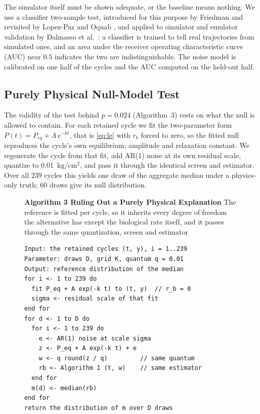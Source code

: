 \documentclass[runningheads]{llncs}
\newcommand{\pu}{\ensuremath{\mathrm{kg/cm^{2}}}}
\newcommand{\rb}{\ensuremath{r_{b}}}
\begin{document}
The simulator itself must be shown adequate, or the baseline means
nothing. We use a classifier two-sample test, introduced for this
purpose by Friedman \cite{friedman2003multivariate} and revisited by
Lopez-Paz and Oquab \cite{lopezpaz2017revisiting}, and applied to
simulator and emulator validation by Dalmasso et
al.~\cite{dalmasso2020validation}: a classifier is trained to tell real
trajectories from simulated ones, and an area under the receiver
operating characteristic curve (AUC) near $0.5$ indicates the
two are indistinguishable. The noise model is calibrated on one half of
the cycles and the AUC computed on the held-out half.

\subsection{Purely Physical Null-Model Test}
\label{sec:null}

The validity of the test behind $p=0.024$ (Algorithm~3) rests on what the null is
allowed to contain. For each retained cycle we fit the two-parameter
form $P(t)=P_{eq}+A\,e^{-kt}$, that is \eqref{eq:le} with $\rb$ forced
to zero, so the fitted null reproduces the cycle's own equilibrium,
amplitude and relaxation constant. We regenerate the cycle from that
fit, add AR(1) noise at its own residual scale, quantize to
$0.01$~\pu{}, and pass it through the identical screen and estimator.
Over all $239$ cycles this yields one draw of the aggregate median
under a physics-only truth; $60$ draws give its null distribution.

\begin{figure}[t]
\noindent\textbf{Algorithm 3  Ruling Out a Purely Physical Explanation}
The reference is fitted per cycle, so it inherits every degree of
freedom the alternative has except the biological rate itself, and it
passes through the same quantization, screen and estimator

\begin{verbatim}
Input: the retained cycles (t, y), i = 1..239
Parameter: draws D, grid K, quantum q = 0.01
Output: reference distribution of the median
for i <- 1 to 239 do
  fit P_eq + A exp(-k t) to (t, y)  // r_b = 0
  sigma <- residual scale of that fit
end for
for d <- 1 to D do
  for i <- 1 to 239 do
    e <- AR(1) noise at scale sigma
    z <- P_eq + A exp(-k t) + e
    w <- q round(z / q)         // same quantum
    rb <- Algorithm 1 (t, w)    // same estimator
  end for
  m(d) <- median(rb)
end for
return the distribution of m over D draws
\end{verbatim}

\end{figure}
\end{document}
